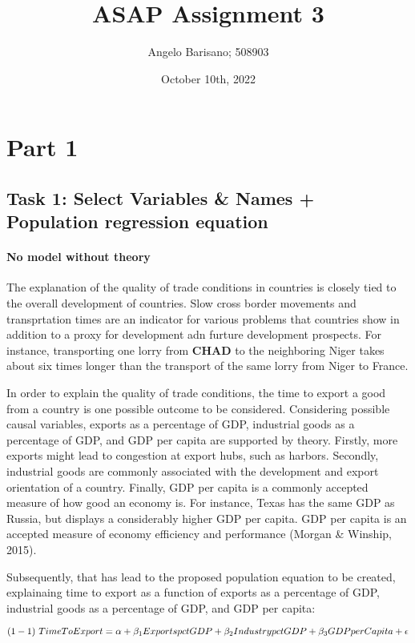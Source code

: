 \documentclass[a4paper]{article}
\begin{document}
\title{ASAP Assignment 3}
\author{Angelo Barisano; 508903 }
\date{October 10th, 2022}
\maketitle

\newpage
\section{Part 1}

\subsection{Task 1: Select Variables \& Names + Population regression equation}

\paragraph{No model without theory} The explanation of the quality of trade conditions in countries is closely tied to the overall development of countries. Slow cross border movements and transprtation times are an indicator for various problems that countries show in addition to a proxy for development adn furture development prospects. For instance, transporting one lorry from \textbf{CHAD} to the neighboring Niger takes about six times longer than the transport of the same lorry from Niger to France. 

In order to explain the quality of trade conditions, the time to export a good from a country is one possible outcome to be considered. Considering possible causal variables, exports as a percentage of GDP, industrial goods as a percentage of GDP, and GDP per capita are supported by theory. 
Firstly, more exports might lead to congestion at export hubs, such as harbors. Secondly, industrial goods are commonly associated with the development and export orientation of a country. Finally, GDP per capita is a commonly accepted measure of how good an economy is. For instance, Texas has the same GDP as Russia, but displays a considerably higher GDP per capita. GDP per capita is an accepted measure of economy efficiency and performance (Morgan \& Winship, 2015). 

Subsequently, that has lead to the proposed population equation to be created, explainaing time to export as a function of  exports as a percentage of GDP, industrial goods as a percentage of GDP, and GDP per capita:

$$ (1-1)   \\\   {Time To Export} = \alpha + \beta_{1}  Exports pct GDP + \beta_{2} Industry pct GDP + \beta_{3} GDP per Capita + \epsilon$$
\end{document}
